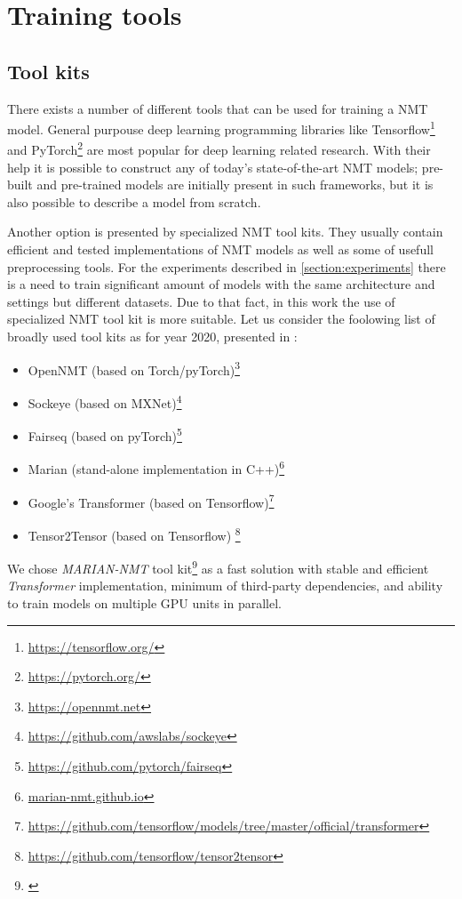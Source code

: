 \section{Training tools}

\subsection{Tool kits}

There exists a number of different tools that can be used for training a NMT model.
General purpouse deep learning programming libraries like
Tensorflow\footnote{\url{https://tensorflow.org/}} and
PyTorch\footnote{\url{https://pytorch.org/}} are most popular for deep learning related
research. With their help it is possible to construct any of today's state-of-the-art
NMT models; pre-built and pre-trained models are initially present in such frameworks,
but it is also possible to describe a model from scratch.

Another option is presented by specialized NMT tool kits.
They usually contain efficient and tested implementations of NMT models as well as some of
usefull preprocessing tools.
For the experiments described in \ref{section:experiments} there is a need to train significant
amount of models with the same architecture and settings but different datasets.
Due to that fact, in this work the use of specialized NMT tool kit is more suitable.
Let us consider the foolowing list of broadly used tool kits as for year 2020,
presented in \cite{koehn_2020}:

\begin{itemize}
  \item OpenNMT (based on Torch/pyTorch)\footnote{\url{https://opennmt.net}}
  \item Sockeye (based on MXNet)\footnote{\url{https://github.com/awslabs/sockeye}}
  \item Fairseq (based on pyTorch)\footnote{\url{https://github.com/pytorch/fairseq}}
  \item Marian (stand-alone implementation in C++)\footnote{\url{marian-nmt.github.io}}
  \item Google's Transformer (based on Tensorflow)\footnote{\url{
    https://github.com/tensorflow/models/tree/master/official/transformer}}
  \item Tensor2Tensor (based on Tensorflow) \footnote{\url{
    https://github.com/tensorflow/tensor2tensor}}
\end{itemize}

We chose \textit{MARIAN-NMT} tool kit\footnote{\cite{mariannmt}} as a fast solution
with stable and efficient \textit{Transformer} \cite{vaswani-2017-transformer} implementation,
minimum of third-party dependencies, and ability to train models on multiple GPU units in parallel.


